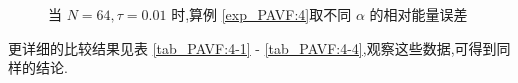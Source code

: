 \begin{figure}[H]
\begin{center}
  
\caption{当  $N = 64, \tau=0.01$ 时,算例 \ref{exp_PAVF:4}取不同 $\alpha$ 的相对能量误差}
\label{fig_PAVF:12}
\end{center}
\end{figure}

更详细的比较结果见表 \ref{tab_PAVF:4-1} - \ref{tab_PAVF:4-4},观察这些数据,可得到同样的结论.

